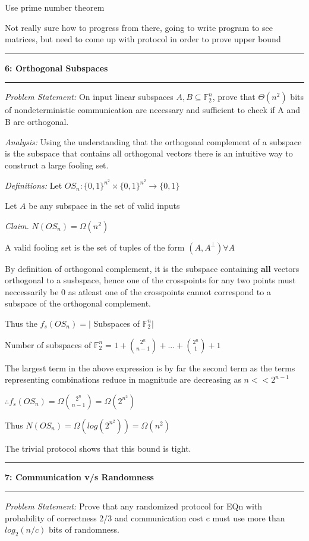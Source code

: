 \documentclass[11pt]{article}
\newcommand\question[2]{\vspace{.25in}\hrule\textbf{#1: #2}\vspace{.5em}\hrule\vspace{.10in}}
\newcommand\analysis{\vspace{.10in}\emph{Analysis: }\newline}
\newcommand\problem{\emph{Problem Statement:}\newline}
\newcommand\definitions{\emph{Definitions:}\newline}
\newcommand\claim{\emph{Claim.}\newline}
\begin{document}
\proof 
Use prime number theorem

Not really sure how to progress from there, going to write program to see matrices, but need to come up with protocol in order to prove upper bound

\newpage

\question{6}{Orthogonal Subspaces}

\problem
On input linear subspaces $A, B \subseteq \mathbb{F}_2^n$, prove that $\Theta(n^2)$ bits of nondeterministic communication are necessary and sufficient to check if A and B are orthogonal.

\analysis
Using the understanding that the orthogonal complement of a subspace is the subspace that contains all orthogonal vectors there is an intuitive way to construct a large fooling set. 

\definitions
Let $OS_n: {\{0, 1\}}^{n^2} \times {\{0, 1\}}^{n^2} \to \{0, 1\}$

Let $A$ be any subspace in the set of valid inputs

\claim
$N(OS_n) = \Omega(n^2)$ 

\proof 
A valid fooling set is the set of tuples of the form $(A, A^{\perp}) \forall A$

By definition of orthogonal complement, it is the subspace containing \textbf{all} vectors orthogonal to a susbspace, hence one of the crosspoints for any two points must neccessarily be 0 as atleast one of the crosspoints cannot correspond to a subspace of the orthogonal complement. 

Thus the $f_s(OS_n) = \lvert$ Subspaces of $\mathbb{F}_2^n \rvert$

Number of subspaces of $\mathbb{F}_2^n = 1 + {2^n \choose n - 1} + ... + {2^n \choose 1} + 1$

The largest term in the above expression is by far the second term as the terms representing combinations reduce in magnitude are decreasing as $n << 2^{n-1}$

$\therefore f_s(OS_n) = \Omega{2^n \choose n - 1} = \Omega({2^{n^2}})$

Thus $N(OS_n) = \Omega(log(2^{n^2})) = \Omega(n^2)$

The trivial protocol shows that this bound is tight. 

\newpage

\question{7}{Communication v/s Randomness}

\problem
Prove that any randomized protocol for EQn with probability of correctness 2/3 and communication cost c must use more than $log_2(n/c)$ bits of randomness.
\end{document}
